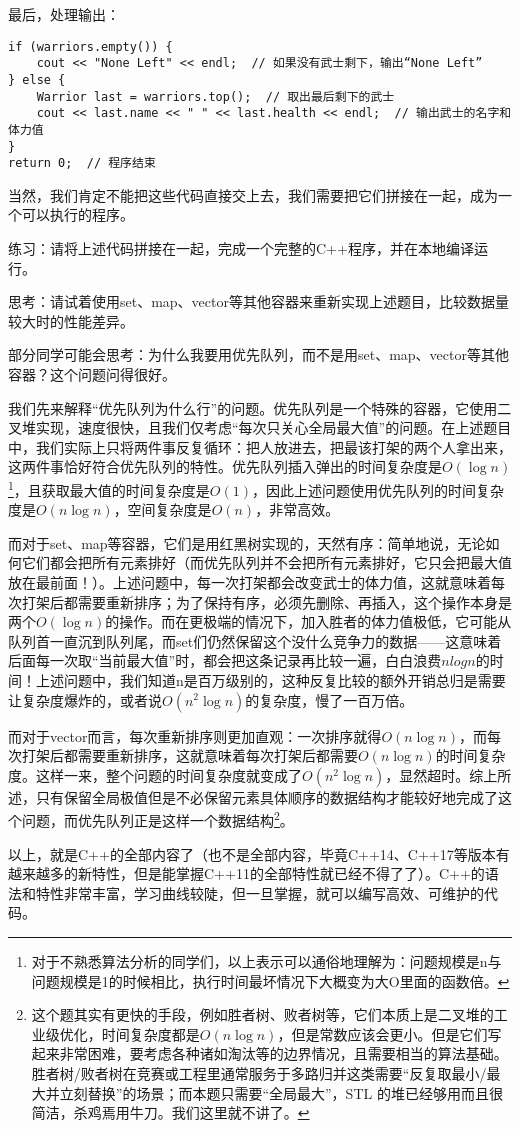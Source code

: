 \documentclass[../main.tex]{subfiles}
\begin{document}
最后，处理输出：
\begin{lstlisting}
if (warriors.empty()) {
    cout << "None Left" << endl;  // 如果没有武士剩下，输出“None Left”
} else {
    Warrior last = warriors.top();  // 取出最后剩下的武士
    cout << last.name << " " << last.health << endl;  // 输出武士的名字和体力值
}
return 0;  // 程序结束
\end{lstlisting}

当然，我们肯定不能把这些代码直接交上去，我们需要把它们拼接在一起，成为一个可以执行的程序。

练习：请将上述代码拼接在一起，完成一个完整的C++程序，并在本地编译运行。

思考：请试着使用set、map、vector等其他容器来重新实现上述题目，比较数据量较大时的性能差异。

部分同学可能会思考：为什么我要用优先队列，而不是用set、map、vector等其他容器？这个问题问得很好。

我们先来解释“优先队列为什么行”的问题。优先队列是一个特殊的容器，它使用二叉堆实现，速度很快，且我们仅考虑“每次只关心全局最大值”的问题。在上述题目中，我们实际上只将两件事反复循环：把人放进去，把最该打架的两个人拿出来，这两件事恰好符合优先队列的特性。优先队列插入弹出的时间复杂度是$O(\log n)$\footnote{对于不熟悉算法分析的同学们，以上表示可以通俗地理解为：问题规模是n与问题规模是1的时候相比，执行时间最坏情况下大概变为大O里面的函数倍。}，且获取最大值的时间复杂度是$O(1)$，因此上述问题使用优先队列的时间复杂度是$O(n \log n)$，空间复杂度是$O(n)$，非常高效。

而对于set、map等容器，它们是用红黑树实现的，天然有序：简单地说，无论如何它们都会把所有元素排好（而优先队列并不会把所有元素排好，它只会把最大值放在最前面！）。上述问题中，每一次打架都会改变武士的体力值，这就意味着每次打架后都需要重新排序；为了保持有序，必须先删除、再插入，这个操作本身是两个$O(\log n)$的操作。而在更极端的情况下，加入胜者的体力值极低，它可能从队列首一直沉到队列尾，而set们仍然保留这个没什么竞争力的数据——这意味着后面每一次取“当前最大值”时，都会把这条记录再比较一遍，白白浪费$n log n $的时间！上述问题中，我们知道n是百万级别的，这种反复比较的额外开销总归是需要让复杂度爆炸的，或者说$O(n^2 \log n)$的复杂度，慢了一百万倍。

而对于vector而言，每次重新排序则更加直观：一次排序就得$O(n \log n)$，而每次打架后都需要重新排序，这就意味着每次打架后都需要$O(n \log n)$的时间复杂度。这样一来，整个问题的时间复杂度就变成了$O(n^2 \log n)$，显然超时。综上所述，只有保留全局极值但是不必保留元素具体顺序的数据结构才能较好地完成了这个问题，而优先队列正是这样一个数据结构\footnote{这个题其实有更快的手段，例如胜者树、败者树等，它们本质上是二叉堆的工业级优化，时间复杂度都是$O(n \log n)$，但是常数应该会更小。但是它们写起来非常困难，要考虑各种诸如淘汰等的边界情况，且需要相当的算法基础。胜者树/败者树在竞赛或工程里通常服务于多路归并这类需要“反复取最小/最大并立刻替换”的场景；而本题只需要“全局最大”，STL 的堆已经够用而且很简洁，杀鸡焉用牛刀。我们这里就不讲了。}。

以上，就是C++的全部内容了（也不是全部内容，毕竟C++14、C++17等版本有越来越多的新特性，但是能掌握C++11的全部特性就已经不得了了）。C++的语法和特性非常丰富，学习曲线较陡，但一旦掌握，就可以编写高效、可维护的代码。
\end{document}
